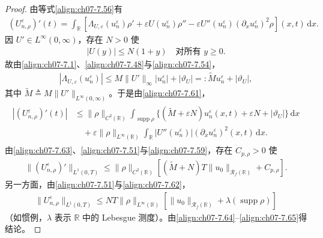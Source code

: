 ﻿\documentclass[../../main.tex]{subfiles}%
\begin{document}
\begin{proof}
由等式\eqref{align:ch07-7.56}有
\begin{align}
(U_{n,\rho}^\varepsilon)'(t)=\int_{\mathbb{R}}[\Lambda_{U,\varepsilon}(u_n^\varepsilon)\rho'+\varepsilon U(u_n^\varepsilon)\rho''
-\varepsilon U''(u_n^\varepsilon)(\partial_xu_n^\varepsilon)^2\rho](x,t)\,\mathrm{d}x. \label{align:ch07-7.61}
\end{align}
因 $U'\in L^\infty(0,\infty)$，存在 $N>0$ 使
\begin{align}
|U(y)|\leqslant N(1+y)\quad\text{对所有 }y\geqslant0. \label{align:ch07-7.62}
\end{align}
故由\eqref{align:ch07-7.1}、\eqref{align:ch07-7.48}与\eqref{align:ch07-7.54}，
\begin{align*}
|\Lambda_{U,\varepsilon}(u_n^\varepsilon)|\leqslant M\|U'\|_\infty|u_n^\varepsilon|+|\vartheta_U|=:\widetilde Mu_n^\varepsilon+|\vartheta_U|,
\end{align*}
其中 $\widetilde M\triangleq M\|U'\|_{L^\infty(0,\infty)}$。于是由\eqref{align:ch07-7.61}，
\begin{align}
\begin{aligned}
|(U_{n,\rho}^\varepsilon)'(t)|
&\leqslant\|\rho\|_{C^2(\mathbb{R})}\int_{\operatorname{supp}\rho}\{(\widetilde M+\varepsilon N)u_n^\varepsilon(x,t)+\varepsilon N+|\vartheta_U|\}\,\mathrm{d}x\\
&\quad+\varepsilon\|\rho\|_{L^\infty(\mathbb{R})}\int_{\mathbb{R}}|U''(u_n^\varepsilon)|(\partial_xu_n^\varepsilon)^2(x,t)\,\mathrm{d}x.
\end{aligned} 
\label{align:ch07-7.63}
\end{align}
由\eqref{align:ch07-7.63}、\eqref{align:ch07-7.51}与\eqref{align:ch07-7.59}，存在 $C_{p,\rho}>0$ 使
\begin{align}
\|(U_{n,\rho}^\varepsilon)'\|_{L^1(0,T)}\leqslant\|\rho\|_{C^2(\mathbb{R})}[(\widetilde M+N)T\|u_0\|_{\mathscr{R}_f(\mathbb{R})}+C_{p,\rho}]. \label{align:ch07-7.64}
\end{align}
另一方面，由\eqref{align:ch07-7.51}与\eqref{align:ch07-7.62}，
\begin{align}
\|U_{n,\rho}^\varepsilon\|_{L^1(0,T)}\leqslant NT\|\rho\|_{L^\infty(\mathbb{R})}[\|u_0\|_{\mathscr{R}_f(\mathbb{R})}+\lambda(\operatorname{supp}\rho)] \label{align:ch07-7.65}
\end{align}
（如惯例，$\lambda$ 表示 $\mathbb{R}$ 中的 Lebesgue 测度）。由\eqref{align:ch07-7.64}--\eqref{align:ch07-7.65}得结论。
\end{proof}
\end{document}
